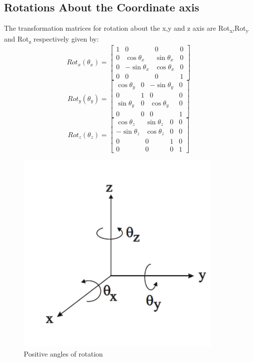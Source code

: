 \documentclass{article}
\begin{document}
\subsection{Rotations About the Coordinate axis}
The transformation matrices for rotation about the x,y and z axis are Rot\textsubscript{x},Rot\textsubscript{y} and Rot\textsubscript{z} respectively given by:
\begin{equation}
    \label{simple_equation_6}
    Rot_{x}(\theta_{x}) =\begin{bmatrix}1 & 0 & 0 & 0 \\0 & \cos\theta_{x} & \sin\theta_{x} & 0 \\0 & -\sin\theta_{x} & \cos\theta_{x} & 0 \\0 & 0 & 0 & 1 \end{bmatrix}
\end{equation}
\begin{equation}
    \label{simple_equation_7}
    Rot_{y}(\theta_{y}) =\begin{bmatrix}\cos\theta_{y} & 0 & -\sin\theta_{y} & 0 \\0 & 1 & 0 & 0 \\\sin\theta_{y} & 0 & \cos\theta_{y} & 0 \\0 & 0 & 0 & 1 \end{bmatrix}
\end{equation}
\begin{equation}
    \label{simple_equation_8}
    Rot_{z}(\theta_{z}) =\begin{bmatrix}\cos\theta_{z} & \sin\theta_{z} & 0 & 0 \\-\sin\theta_{z} & \cos\theta_{z} & 0 & 0 \\0 & 0 & 1 & 0 \\0 & 0 & 0 & 1 \end{bmatrix}
\end{equation}

\begin{figure}[h]
  \includegraphics[width=10cm,height=10cm]{axis.png}
  \caption{Positive angles of rotation}
  \label{fig:boat1}
\end{figure}
\end{document}
